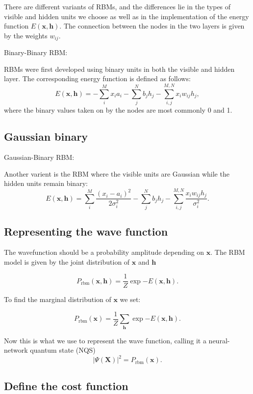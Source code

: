 \documentclass[%
oneside,                 %
final,                   %
10pt]{article}
\begin{document}
There are different variants of RBMs, and the differences lie in the types of visible and hidden units we choose as well as in the implementation of the energy function $E(\bm{x},\bm{h})$. The connection between the nodes in the two layers is given by the weights $w_{ij}$. 

\begin{block}{Binary-Binary RBM: }

RBMs were first developed using binary units in both the visible and hidden layer. The corresponding energy function is defined as follows:
\[
	E(\bm{x}, \bm{h}) = - \sum_i^M x_i a_i- \sum_j^N b_j h_j - \sum_{i,j}^{M,N} x_i w_{ij} h_j,
\]
where the binary values taken on by the nodes are most commonly 0 and 1.
\end{block}

\subsection{Gaussian binary}

\begin{block}{Gaussian-Binary RBM: }

Another varient is the RBM where the visible units are Gaussian while the hidden units remain binary:
\[
	E(\bm{x}, \bm{h}) = \sum_i^M \frac{(x_i - a_i)^2}{2\sigma_i^2} - \sum_j^N b_j h_j - \sum_{i,j}^{M,N} \frac{x_i w_{ij} h_j}{\sigma_i^2}. 
\]
\end{block}

\subsection{Representing the wave function}

The wavefunction should be a probability amplitude depending on
 $\bm{x}$. The RBM model is given by the joint distribution of
 $\bm{x}$ and $\bm{h}$

\[
        P_{\mathrm{rbm}}(\bm{x},\bm{h}) = \frac{1}{Z} \exp{-E(\bm{x},\bm{h})}.
\]

To find the marginal distribution of $\bm{x}$ we set:

\[
        P_{\mathrm{rbm}}(\bm{x}) =\frac{1}{Z}\sum_{\bm{h}} \exp{-E(\bm{x}, \bm{h})}.
\]

Now this is what we use to represent the wave function, calling it a neural-network quantum state (NQS)
\[
        \vert\Psi (\bm{X})\vert^2 = P_{\mathrm{rbm}}(\bm{x}).
\]

\subsection{Define the cost function}
\end{document}
